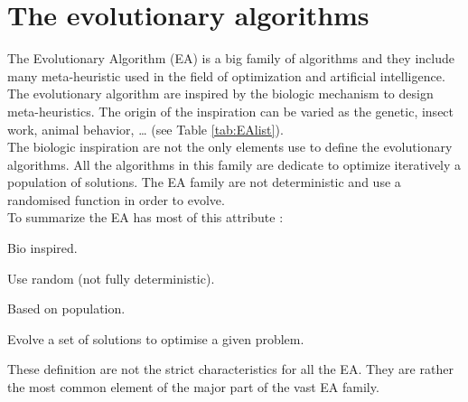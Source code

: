 \section{The evolutionary algorithms }
The Evolutionary Algorithm (EA) is a big family of algorithms and they include many meta-heuristic used in the field of optimization and artificial intelligence.\\
 The evolutionary algorithm are inspired by the biologic mechanism to design meta-heuristics. The origin of the inspiration can be varied as  the genetic, insect work, animal behavior, … (see Table  \ref{tab:EAlist}). \\
 The biologic inspiration are not the only elements use to define the evolutionary algorithms. All the algorithms in this family are dedicate to optimize iteratively a population of solutions. 
 The EA family are not deterministic and use a randomised function in order to evolve. \\
 To summarize the EA has most of this attribute : 
\begin{description}
\item Bio inspired. 
\item Use random (not fully deterministic).
\item Based on population. 
\item Evolve a set of solutions to optimise a given problem.
\end{description}
These definition are not the strict characteristics for all the EA. They are rather the most common element of the major part of the vast EA family. %
 
